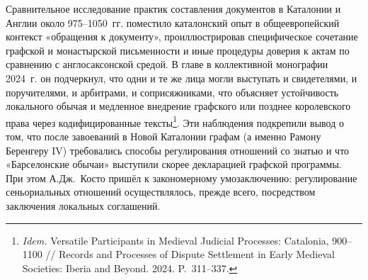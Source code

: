 Сравнительное исследование практик составления документов в Каталонии и Англии около 975--1050~гг. поместило каталонский опыт в общеевропейский контекст «обращения к документу», проиллюстрировав специфическое сочетание графской и монастырской письменности и иные процедуры доверия к актам по сравнению с англосаксонской средой. В главе в коллективной монографии 2024~г. он подчеркнул, что одни и те же лица могли выступать и свидетелями, и поручителями, и арбитрами, и соприсяжниками, что объясняет устойчивость локального обычая и медленное внедрение графского или позднее королевского права через кодифицированные тексты\footnote{\emph{Idem.} Versatile Participants in Medieval Judicial Processes: Catalonia, 900--1100 // Records and Processes of Dispute Settlement in Early Medieval Societies: Iberia and Beyond. 2024. P.~311--337.}. Эти наблюдения подкрепили вывод о том, что после завоеваний в Новой Каталонии графам (а именно Рамону Беренгеру IV) требовались способы регулирования отношений со знатью и что «Барселонские обычаи» выступили скорее декларацией графской программы. При этом А.Дж.~Косто пришёл к закономерному умозаключению: регулирование сеньориальных отношений осуществлялось, прежде всего, посредством заключения локальных соглашений.

